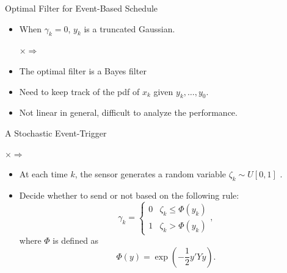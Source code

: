 \documentclass[10pt]{beamer}
\newlength\figureheight
\newlength\figurewidth
\newcommand{\tikzdir}[1]{#1.tikz}
\newcommand{\inputtikz}[1]{}}
\DeclareMathOperator{\1}{\textbf{1}}
\begin{document}
\begin{frame}{Optimal Filter for Event-Based Schedule}

  \begin{itemize}
    \item When $\gamma_k = 0$, $y_k$ is a truncated Gaussian.
      \setlength\figureheight{2cm}
      \setlength\figurewidth{3cm}
      \begin{center}
	\inputtikz{gaussian}$\times$\inputtikz{det}$\Rightarrow$\inputtikz{det2}
      \end{center}
    \item The optimal filter is a Bayes filter 
    \item Need to keep track of the pdf of $x_k$ given $y_k,\dots,y_0$.
    \item Not linear in general, difficult to analyze the performance.
  \end{itemize}
\end{frame}

\begin{frame}{A Stochastic Event-Trigger}
  \setlength\figureheight{2cm}
  \setlength\figurewidth{3cm}
  \begin{center}
    \inputtikz{gaussian}$\times$\inputtikz{rand}$\Rightarrow$\inputtikz{rand2}
  \end{center}
  \begin{itemize}
    \item At each time $k$, the sensor generates a random variable $\zeta_k\sim U[0,1]$ .
    \item Decide whether to send or not based on the following rule:
      \begin{displaymath}
	\gamma_k= \begin{cases}
	  0&\zeta_k \leq \Phi(y_k)\\
	  1&\zeta_k > \Phi(y_k)
	\end{cases},
      \end{displaymath}
      where $\Phi$ is defined as
      \begin{displaymath}
	\Phi(y) = \exp\left( -\frac{1}{2}y'Yy \right). 
      \end{displaymath}
  \end{itemize}
\end{frame}
\end{document}
